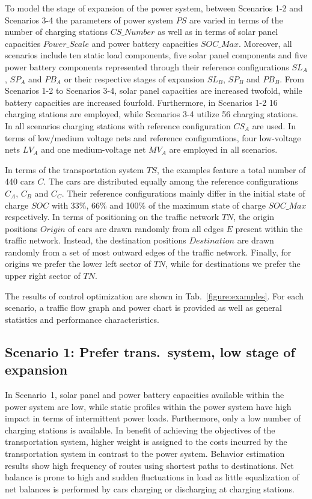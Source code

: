 To model the stage of expansion of the power system, between Scenarios 1-2 and Scenarios 3-4 the parameters of power system $PS$ are varied in terms of the number of charging stations $CS\_Number$ as well as in terms of solar panel capacities $Power\_Scale$ and power battery capacities $SOC\_Max$. Moreover, all scenarios include ten static load components, five solar panel components and five power battery components represented through their reference configurations $SL_{A}$, $SP_{A}$ and $PB_{A}$ or their respective stages of expansion $SL_{B}$, $SP_{B}$ and $PB_{B}$. From Scenarios 1-2 to Scenarios 3-4, solar panel capacities are increased twofold, while battery capacities are increased fourfold. Furthermore, in Scenarios 1-2 16 charging stations are employed, while Scenarios 3-4 utilize 56 charging stations. In all scenarios charging stations with reference configuration $CS_{A}$ are used. In terms of low/medium voltage nets and reference configurations, four low-voltage nets $LV_{A}$ and one medium-voltage net $MV_{A}$ are employed in all scenarios. 

In terms of the transportation system $TS$, the examples feature a total number of 440 cars $C$. The cars are distributed equally among the reference configurations $C_{A}$, $C_{B}$ and $C_{C}$. Their reference configurations mainly differ in the initial state of charge $SOC$ with 33\%, 66\% and 100\% of the maximum state of charge $SOC\_Max$ respectively. In terms of positioning on the traffic network $TN$, the origin positions $Origin$ of cars are drawn randomly from all edges $E$ present within the traffic network. Instead, the destination positions $Destination$ are drawn randomly from a set of most outward edges of the traffic network. Finally, for origins we prefer the lower left sector of $TN$, while for destinations we prefer the upper right sector of $TN$.

The results of control optimization are shown in Tab.~\ref{figure:examples}. For each scenario, a traffic flow graph and power chart is provided as well as general statistics and performance characteristics.

\subsection*{Scenario 1: Prefer trans.\ system, low stage of expansion}

In Scenario~1, solar panel and power battery capacities available within the power system are low, while static profiles within the power system have high impact in terms of intermittent power loads. Furthermore, only a low number of charging stations is available. In benefit of achieving the objectives of the transportation system, higher weight is assigned to the costs incurred by the transportation system in contrast to the power system. Behavior estimation results show high frequency of routes using shortest paths to destinations. Net balance is prone to high and sudden fluctuations in load as little equalization of net balances is performed by cars charging or discharging at charging stations.

